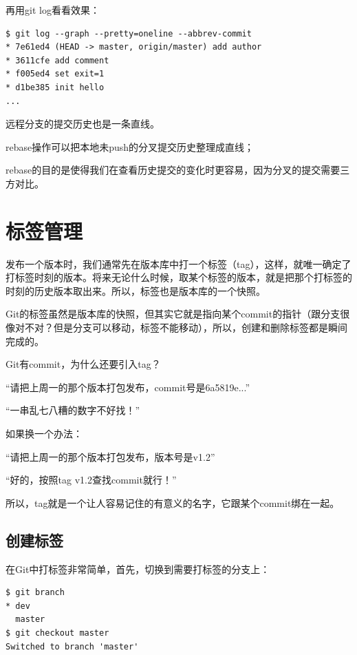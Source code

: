 再用git log看看效果：

\begin{verbatim}
$ git log --graph --pretty=oneline --abbrev-commit
* 7e61ed4 (HEAD -> master, origin/master) add author
* 3611cfe add comment
* f005ed4 set exit=1
* d1be385 init hello
...
\end{verbatim}

远程分支的提交历史也是一条直线。

\begin{tcolorbox}

rebase操作可以把本地未push的分叉提交历史整理成直线；

rebase的目的是使得我们在查看历史提交的变化时更容易，因为分叉的提交需要三方对比。
\end{tcolorbox}

\chapter{标签管理}

发布一个版本时，我们通常先在版本库中打一个标签（tag），这样，就唯一确定了打标签时刻的版本。将来无论什么时候，取某个标签的版本，就是把那个打标签的时刻的历史版本取出来。所以，标签也是版本库的一个快照。

Git的标签虽然是版本库的快照，但其实它就是指向某个commit的指针（跟分支很像对不对？但是分支可以移动，标签不能移动），所以，创建和删除标签都是瞬间完成的。

Git有commit，为什么还要引入tag？

“请把上周一的那个版本打包发布，commit号是6a5819e...”

“一串乱七八糟的数字不好找！”

如果换一个办法：

“请把上周一的那个版本打包发布，版本号是v1.2”

“好的，按照tag v1.2查找commit就行！”

所以，tag就是一个让人容易记住的有意义的名字，它跟某个commit绑在一起。

\section{创建标签}
在Git中打标签非常简单，首先，切换到需要打标签的分支上：

\begin{verbatim}
$ git branch
* dev
  master
$ git checkout master
Switched to branch 'master'
\end{verbatim}

